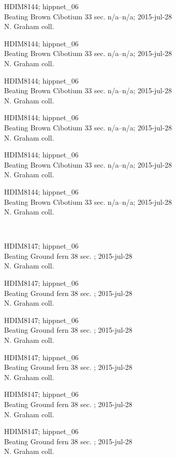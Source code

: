 \documentclass[2pt]{extarticle}
\begin{document}
\noindent
\parbox{0.16\textwidth}{\tiny \raggedright \rule[-0.3\baselineskip]{0pt}{10pt}HDIM8144; hippnet\_06\\ Beating Brown Cibotium 33 sec. n/a--n/a; 2015-jul-28\\ N. Graham coll.}
\parbox{0.16\textwidth}{\tiny \raggedright \rule[-0.3\baselineskip]{0pt}{10pt}HDIM8144; hippnet\_06\\ Beating Brown Cibotium 33 sec. n/a--n/a; 2015-jul-28\\ N. Graham coll.}
\parbox{0.16\textwidth}{\tiny \raggedright \rule[-0.3\baselineskip]{0pt}{10pt}HDIM8144; hippnet\_06\\ Beating Brown Cibotium 33 sec. n/a--n/a; 2015-jul-28\\ N. Graham coll.}
\parbox{0.16\textwidth}{\tiny \raggedright \rule[-0.3\baselineskip]{0pt}{10pt}HDIM8144; hippnet\_06\\ Beating Brown Cibotium 33 sec. n/a--n/a; 2015-jul-28\\ N. Graham coll.}
\parbox{0.16\textwidth}{\tiny \raggedright \rule[-0.3\baselineskip]{0pt}{10pt}HDIM8144; hippnet\_06\\ Beating Brown Cibotium 33 sec. n/a--n/a; 2015-jul-28\\ N. Graham coll.}
\parbox{0.16\textwidth}{\tiny \raggedright \rule[-0.3\baselineskip]{0pt}{10pt}HDIM8144; hippnet\_06\\ Beating Brown Cibotium 33 sec. n/a--n/a; 2015-jul-28\\ N. Graham coll.} \\ 
\vspace{0.001in} 

\noindent
\parbox{0.16\textwidth}{\tiny \raggedright \rule[-0.3\baselineskip]{0pt}{10pt}HDIM8147; hippnet\_06\\ Beating Ground fern 38 sec. ; 2015-jul-28\\ N. Graham coll.}
\parbox{0.16\textwidth}{\tiny \raggedright \rule[-0.3\baselineskip]{0pt}{10pt}HDIM8147; hippnet\_06\\ Beating Ground fern 38 sec. ; 2015-jul-28\\ N. Graham coll.}
\parbox{0.16\textwidth}{\tiny \raggedright \rule[-0.3\baselineskip]{0pt}{10pt}HDIM8147; hippnet\_06\\ Beating Ground fern 38 sec. ; 2015-jul-28\\ N. Graham coll.}
\parbox{0.16\textwidth}{\tiny \raggedright \rule[-0.3\baselineskip]{0pt}{10pt}HDIM8147; hippnet\_06\\ Beating Ground fern 38 sec. ; 2015-jul-28\\ N. Graham coll.}
\parbox{0.16\textwidth}{\tiny \raggedright \rule[-0.3\baselineskip]{0pt}{10pt}HDIM8147; hippnet\_06\\ Beating Ground fern 38 sec. ; 2015-jul-28\\ N. Graham coll.}
\parbox{0.16\textwidth}{\tiny \raggedright \rule[-0.3\baselineskip]{0pt}{10pt}HDIM8147; hippnet\_06\\ Beating Ground fern 38 sec. ; 2015-jul-28\\ N. Graham coll.} \\ 
\vspace{0.001in} 
\end{document}
